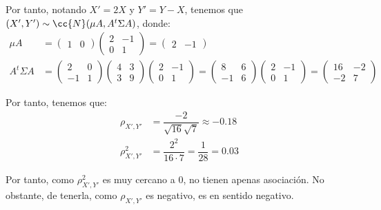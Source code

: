 \documentclass[12pt]{article}
\begin{document}
\begin{ejercicio}[2.5 puntos]
\begin{enumerate}
            Por tanto, notando $X'=2X$ y $Y'=Y-X$, tenemos que $(X',Y')\sim \cc{N}(\mu A,A^t\Sigma A)$, donde:
            \begin{align*}
                \mu A &= \begin{pmatrix}
                    1&0
                \end{pmatrix}\begin{pmatrix}
                    2 & -1 \\ 0 & 1
                \end{pmatrix} = \begin{pmatrix}
                    2 & -1
                \end{pmatrix}
                \\
                A^t\Sigma A &= \begin{pmatrix}
                    2 & 0 \\ -1 & 1
                \end{pmatrix}\begin{pmatrix}
                    4 & 3 \\ 3 & 9
                \end{pmatrix}\begin{pmatrix}
                    2 & -1 \\ 0 & 1
                \end{pmatrix} = \begin{pmatrix}
                    8 & 6 \\ -1 & 6
                \end{pmatrix}
                \begin{pmatrix}
                    2 & -1 \\ 0 & 1
                \end{pmatrix}
                = \begin{pmatrix}
                    16 & -2 \\ -2 & 7
                \end{pmatrix}
            \end{align*}

            Por tanto, tenemos que:
            \begin{align*}
                \rho_{X',Y'} &= \dfrac{-2}{\sqrt{16}\sqrt{7}} \approx -0.18\\
                \rho_{X',Y'}^2 &= \dfrac{2^2}{16\cdot 7} = \dfrac{1}{28} = 0.03
            \end{align*}

            Por tanto, como $\rho_{X',Y'}^2$ es muy cercano a $0$, no tienen apenas asociación. No obstante, de tenerla, como $\rho_{X',Y'}$ es negativo, es en sentido negativo.
        \end{enumerate}
    \end{ejercicio}
\end{document}
